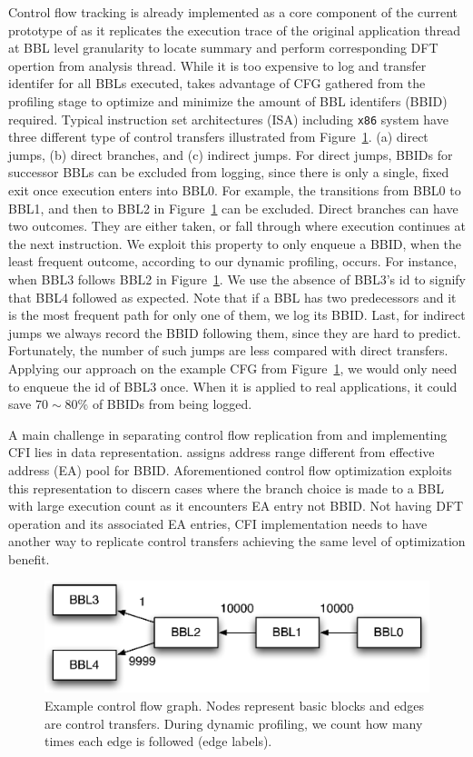 Control flow tracking is already implemented as a core component of the current
prototype of \sreplica as it replicates the execution trace of the original
application thread at BBL level granularity to locate \tfa summary and perform
corresponding DFT opertion from analysis thread. 
%
While it is too expensive to log and transfer identifer for all BBLs executed,
\sreplica takes advantage of CFG gathered from the profiling stage to optimize
and minimize the amount of BBL identifers (BBID) required.
%
Typical instruction set architectures (ISA) including {\tt x86} system have
three different type of control transfers illustrated from
Figure~\ref{fig:cfg0}. (a) direct jumps, (b) direct branches, and (c) indirect
jumps. For direct jumps, BBIDs for successor BBLs can be excluded from logging,
since there is only a single, fixed exit once execution enters into BBL0. For
example, the transitions from BBL0 to BBL1, and then to BBL2 in
Figure~\ref{fig:cfg0} can be excluded. Direct branches can have two outcomes.
They are either taken, or fall through where execution continues at the next
instruction. We exploit this property to only enqueue a BBID, when the least
frequent outcome, according to our dynamic profiling, occurs. For instance,
when BBL3 follows BBL2 in Figure~\ref{fig:cfg0}. We use the absence of BBL3’s
id to signify that BBL4 followed as expected. Note that if a BBL has two
predecessors and it is the most frequent path for only one of them, we log its
BBID. Last, for indirect jumps we always record the BBID following them, since
they are hard to predict.  
%
Fortunately, the number of such jumps are less compared with direct transfers.
Applying our approach on the example CFG from Figure~\ref{fig:cfg0}, we would
only need to enqueue the id of BBL3 once. When it is applied to real
applications, it could save $70 \sim 80 \%$ of BBIDs from being logged.

A main challenge in separating control flow replication from \sreplica and
implementing CFI lies in data representation. \sreplica assigns address range
different from effective address (EA) pool for BBID. Aforementioned control
flow optimization exploits this representation to discern cases where the
branch choice is made to a BBL with large execution count as it encounters EA
entry not BBID.
%
Not having DFT operation and its associated EA entries, CFI implementation
needs to have another way to replicate control transfers achieving the same
level of optimization benefit.

\begin{figure}[tb]
    \centering
    \includegraphics[width=0.64\linewidth]{figs/cfg0.eps}
    \caption{Example control flow graph. Nodes represent basic blocks and edges
    are control transfers. During dynamic profiling, we count how many times
    each edge is followed (edge labels). \label{fig:cfg0}}
\end{figure}


